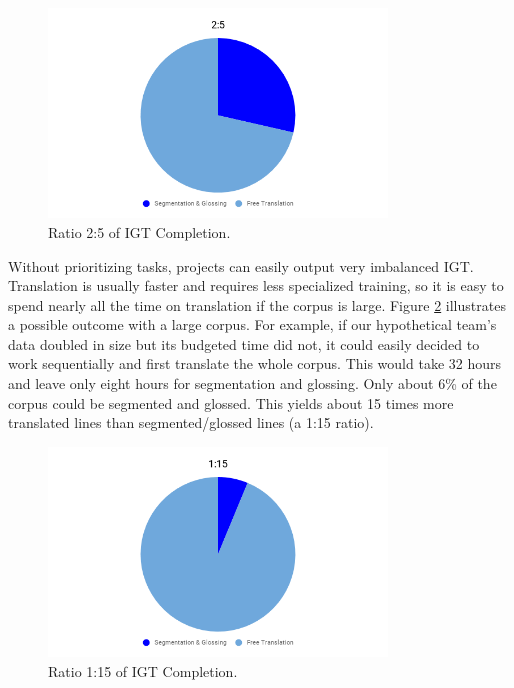 \begin{figure}[H]
\begin{center}
\includegraphics[width=9cm]{figs/Ratio2-5.png}
\caption[Ratio 2:5 of IGT Completion]{Ratio 2:5 of IGT Completion.}
\label{fig:ratio2:5}
\end{center}
\end{figure}

Without prioritizing tasks, projects can easily output very imbalanced IGT. Translation is usually faster and requires less specialized training, so it is easy to spend nearly all the time on translation if the corpus is large. Figure \ref{fig:ratio1:15} illustrates a possible outcome with a large corpus. For example, if our hypothetical team's data doubled in size but its budgeted time did not, it could easily decided to work sequentially and first translate the whole corpus. This would take 32 hours and leave only eight hours for segmentation and glossing.
Only about 6\% of the corpus could be segmented and glossed. This yields about 15 times more translated lines than segmented/glossed lines (a 1:15 ratio). 

\begin{figure}[H]
    \begin{center}
    \includegraphics[width=9cm]{figs/Ratio1-15.png}
    \caption[Ratio 1:15 of IGT Completion] {Ratio 1:15 of IGT Completion.}
    \label{fig:ratio1:15}
\end{center}
\end{figure}

